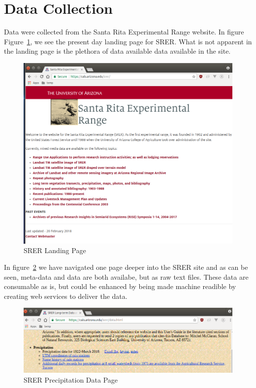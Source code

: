\section{Data Collection}
Data were collected from the Santa Rita Experimental Range website.  In figure 
Figure~\ref{f:srer_landing_page}, we see the present day landing page for SRER.  
What is not apparent in the landing page is the plethora of data available 
data available in the site.
\begin{figure}[!ht]
  \centering\includegraphics[width=\columnwidth]{./images/srer_landing_page.png}
  \caption{SRER Landing Page}\label{f:srer_landing_page}
\end{figure}\cite{hid505SrerWebSite2018}

In figure~\ref{f:srer_precip_data_page} we have navigated one page deeper into the 
SRER site and as can be seen, meta-data and data are both availabe, but as raw 
text files.  These data are consumable as is, but could be enhanced by being 
made machine readible by creating web services to deliver the data.
\begin{figure}[!ht]
  \centering\includegraphics[width=\columnwidth]{./images/srer_precip_data_page.png}
  \caption{SRER Precipitation Data Page}\label{f:srer_precip_data_page}
\end{figure}\cite{hid505SrerWebSite2018}

